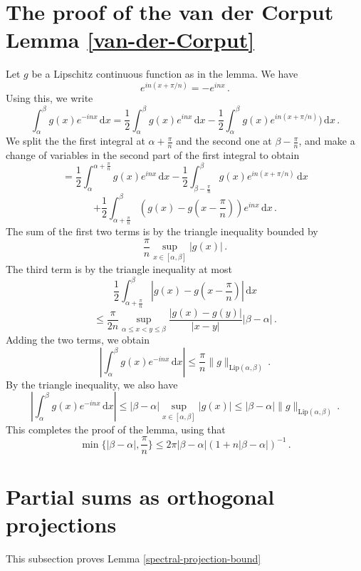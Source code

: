 {\section{The proof of the van der Corput Lemma \ref{van-der-Corput}}
\label{10vandercorput}

Let $g$ be a Lipschitz continuous function as in the lemma. We have
$$
    e^{in(x + \pi/n)} = -e^{inx}\,.
$$
Using this, we write
$$
    \int_\alpha^\beta g(x) e^{-inx} \, \mathrm{d}x
    = \frac{1}{2} \int_\alpha^\beta g(x) e^{inx} \, \mathrm{d}x - \frac{1}{2} \int_\alpha^\beta g(x) e^{in(x + \pi/n)}) \, \mathrm{d}x\,.
$$
We split the the first integral at $\alpha + \frac{\pi}{n}$ and the second one at $\beta - \frac{\pi}{n}$, and make a change of variables in the second part of the first integral to obtain
$$
    = \frac{1}{2} \int_{\alpha}^{\alpha + \frac{\pi}{n}} g(x) e^{inx} \, \mathrm{d}x - \frac{1}{2} \int_{\beta - \frac{\pi}{n}}^{\beta} g(x) e^{in(x + \pi/n)} \, \mathrm{d}x
$$
$$
    + \frac{1}{2} \int_{\alpha + \frac{\pi}{n}}^{\beta} (g(x) - g(x - \frac{\pi}{n})) e^{inx} \, \mathrm{d}x\,.
$$
The sum of the first two terms is by the triangle inequality bounded by
$$
    \frac{\pi}{n} \sup_{x \in [\alpha,\beta]} |g(x)|\,.
$$
The third term is by the triangle inequality at most
$$
    \frac{1}{2} \int_{\alpha + \frac{\pi}{n}}^\beta |g(x) - g(x - \frac{\pi}{n})| \, \mathrm{d}x
$$
$$
    \le \frac{\pi}{2n} \sup_{\alpha \le x < y \le \beta} \frac{|g(x) - g(y)|}{|x-y|} |\beta-\alpha|\,.
$$
Adding the two terms, we obtain
$$
    \left|\int_\alpha^\beta g(x) e^{-inx} \, \mathrm{d}x\right| \le \frac{\pi}{n} \|g\|_{\mathrm{Lip}(\alpha,\beta)}\,.
$$
By the triangle inequality, we also have
$$
    \left|\int_\alpha^\beta g(x) e^{-inx} \, \mathrm{d}x\right| \le |\beta -\alpha| \sup_{x \in [\alpha,\beta]} |g(x)| \le |\beta-\alpha| \|g\|_{\mathrm{Lip}(\alpha,\beta)}\,.
$$
This completes the proof of the lemma, using that
$$
    \min\{|\beta-\alpha|, \frac{\pi}{n}\} \le 2 \pi |\beta-\alpha|(1 + n|\beta-\alpha|)^{-1}\,.
$$





\section{Partial sums as orthogonal projections}
\label{10projection}

This subsection proves Lemma \ref{spectral-projection-bound}






}
